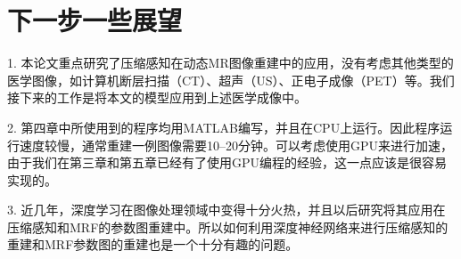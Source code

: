 \section{下一步一些展望}
1. 本论文重点研究了压缩感知在动态MR图像重建中的应用，没有考虑其他类型的医学图像，如计算机断层扫描（CT）、超声（US）、正电子成像（PET）等。我们接下来的工作是将本文的模型应用到上述医学成像中。

2. 第四章中所使用到的程序均用MATLAB编写，并且在CPU上运行。因此程序运行速度较慢，通常重建一例图像需要10--20分钟。可以考虑使用GPU来进行加速，由于我们在第三章和第五章已经有了使用GPU编程的经验，这一点应该是很容易实现的。

3. 近几年，深度学习在图像处理领域中变得十分火热，并且以后研究将其应用在压缩感知和MRF的参数图重建中。所以如何利用深度神经网络来进行压缩感知的重建和MRF参数图的重建也是一个十分有趣的问题。
